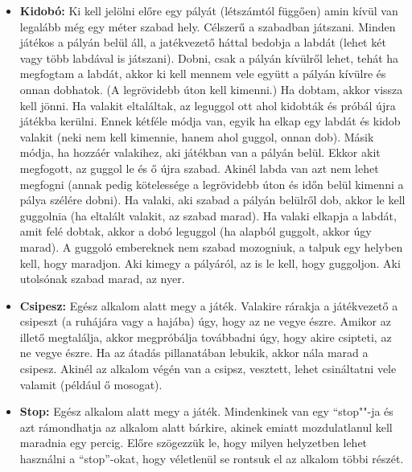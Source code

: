 \documentclass[a4paper, 12pt, twoside, openright]{article}
\begin{document}
\begin{itemize}
\item \textbf{Kidobó:} Ki kell jelölni előre egy pályát (létszámtól függően) amin kívül van legalább még egy méter szabad hely. Célszerű a szabadban játszani. Minden játékos a pályán belül áll, a jatékvezető háttal bedobja a labdát (lehet két vagy több labdával is játszani). Dobni, csak a pályán kívülről lehet, tehát ha megfogtam a labdát, akkor ki kell mennem vele együtt a pályán kívülre és onnan dobhatok. (A legrövidebb úton kell kimenni.) Ha dobtam, akkor vissza kell jönni. Ha valakit eltaláltak, az leguggol ott ahol kidobták és próbál újra játékba kerülni. Ennek kétféle módja van, egyik ha elkap egy labdát és kidob valakit (neki nem kell kimennie, hanem ahol guggol, onnan dob). Másik módja, ha hozzáér valakihez, aki játékban van a pályán belül. Ekkor akit megfogott, az guggol le és ő újra szabad. Akinél labda van azt nem lehet megfogni (annak pedig kötelessége a legrövidebb úton és időn belül kimenni a pálya szélére dobni). Ha valaki, aki szabad a pályán belülről dob, akkor le kell guggolnia (ha eltalált valakit, az szabad marad). Ha valaki elkapja a labdát, amit felé dobtak, akkor a dobó leguggol (ha alapból guggolt, akkor úgy marad). A guggoló embereknek nem szabad mozogniuk, a talpuk egy helyben kell, hogy maradjon. Aki kimegy a pályáról, az is le kell, hogy guggoljon. Aki utolsónak szabad marad, az nyer.

\item \textbf{Csipesz:} Egész alkalom alatt megy a játék. Valakire rárakja a játékvezető a csipeszt (a ruhájára vagy a hajába) úgy, hogy az ne vegye észre. Amikor az illető megtalálja, akkor megpróbálja továbbadni úgy, hogy akire csipteti, az ne vegye észre. Ha az átadás pillanatában lebukik, akkor nála marad a csipesz. Akinél az alkalom végén van a csipsz, vesztett, lehet csináltatni vele valamit (például ő mosogat).

\item \textbf{Stop:} Egész alkalom alatt megy a játék. Mindenkinek van egy ``stop""-ja és azt rámondhatja az alkalom alatt bárkire, akinek emiatt mozdulatlanul kell maradnia egy percig. Előre szögezzük le, hogy milyen helyzetben lehet használni a ``stop''-okat, hogy véletlenül se rontsuk el az alkalom többi részét.


\end{itemize}
\end{document}
